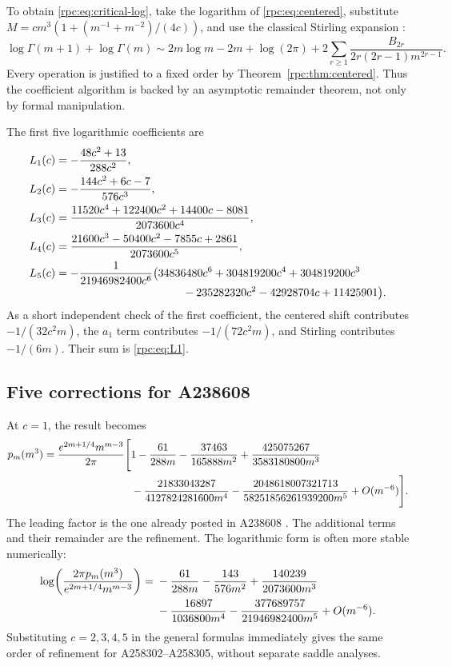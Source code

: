 \documentclass[11pt]{article}
\theoremstyle{definition}
\theoremstyle{remark}
\numberwithin{equation}{section}
\begin{document}
To obtain \eqref{rpc:eq:critical-log}, take the logarithm of
\eqref{rpc:eq:centered}, substitute $M=c m^3(1+(m^{-1}+m^{-2})/(4c))$, and
use the classical Stirling expansion \cite{dlmf}:
\begin{equation}\label{rpc:eq:stirling}
 \log\Gamma(m+1)+\log\Gamma(m)
 \sim 2m\log m-2m+\log(2\pi)
       +2\sum_{r\ge1}\frac{B_{2r}}{2r(2r-1)m^{2r-1}}.
\end{equation}
Every operation is justified to a fixed order by Theorem~\ref{rpc:thm:centered}.
Thus the coefficient algorithm is backed by an asymptotic remainder theorem,
not only by formal manipulation.

The first five logarithmic coefficients are
\begin{align}
 L_1(c)&=-\frac{48c^2+13}{288c^2},\label{rpc:eq:L1}\\
 L_2(c)&=-\frac{144c^2+6c-7}{576c^3},\label{rpc:eq:L2}\\
 L_3(c)&=\frac{11520c^4+122400c^2+14400c-8081}{2073600c^4},\\
 L_4(c)&=\frac{21600c^3-50400c^2-7855c+2861}{2073600c^5},\\
 L_5(c)&=-\frac{1}{21946982400c^6}\bigl(
 34836480c^6+304819200c^4+304819200c^3\notag\\[-2pt]
 &\hspace{40mm}{}-235282320c^2-42928704c+11425901\bigr).
\end{align}
As a short independent check of the first coefficient, the centered shift
contributes $-1/(32c^2m)$, the $a_1$ term contributes
$-1/(72c^2m)$, and Stirling contributes $-1/(6m)$.
Their sum is \eqref{rpc:eq:L1}.

\subsection{Five corrections for A238608}

At $c=1$, the result becomes
\begin{align}\label{rpc:eq:A238608}
 p_m(m^3)=\frac{e^{2m+1/4}m^{m-3}}{2\pi}\Bigg[
 &1-\frac{61}{288m}-\frac{37463}{165888m^2}
 +\frac{425075267}{3583180800m^3}\notag\\
 &-\frac{21833043287}{4127824281600m^4}
 -\frac{2048618007321713}{58251856261939200m^5}
 +O(m^{-6})\Bigg].
\end{align}
The leading factor is the one already posted in A238608
\cite{oeis238608}. The additional terms and their remainder are the refinement.
The logarithmic form is often more stable numerically:
\begin{align}\label{rpc:eq:c1log}
 \log\!\left(\frac{2\pi p_m(m^3)}{e^{2m+1/4}m^{m-3}}\right)
 ={}&-\frac{61}{288m}-\frac{143}{576m^2}
 +\frac{140239}{2073600m^3}\notag\\
 &-\frac{16897}{1036800m^4}
 -\frac{377689757}{21946982400m^5}+O(m^{-6}).
\end{align}
Substituting $c=2,3,4,5$ in the general formulas immediately gives the same
order of refinement for A258302--A258305, without separate saddle analyses.
\end{document}
